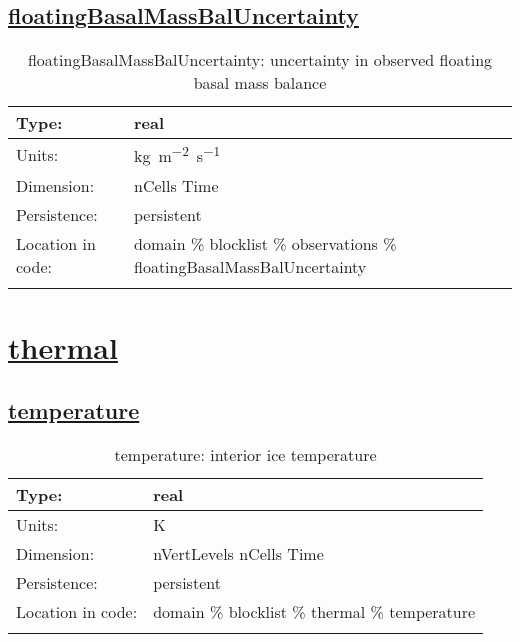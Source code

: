 \subsection[floatingBasalMassBalUncertainty]{\hyperref[sec:var_tab_observations]{floatingBasalMassBalUncertainty}}
\label{subsec:var_sec_observations_floatingBasalMassBalUncertainty}
\begin{center}
\begin{longtable}{| p{2.0in} | p{4.0in} |}
        \hline 
        Type: & real \\
        \hline 
        Units: & \si{kg.m^{-2}.s^{-1}} \\
        \hline 
        Dimension: & nCells Time \\
        \hline 
        Persistence: & persistent \\
        \hline 
         Location in code: & domain \% blocklist \% observations \% floatingBasalMassBalUncertainty \\
         \hline 
    \caption{floatingBasalMassBalUncertainty: uncertainty in observed floating basal mass balance}
\end{longtable}
\end{center}
\section[thermal]{\hyperref[sec:var_tab_thermal]{thermal}}
\label{sec:var_sec_thermal}
\subsection[temperature]{\hyperref[sec:var_tab_thermal]{temperature}}
\label{subsec:var_sec_thermal_temperature}
\begin{center}
\begin{longtable}{| p{2.0in} | p{4.0in} |}
        \hline 
        Type: & real \\
        \hline 
        Units: & \si{K} \\
        \hline 
        Dimension: & nVertLevels nCells Time \\
        \hline 
        Persistence: & persistent \\
        \hline 
         Location in code: & domain \% blocklist \% thermal \% temperature \\
         \hline 
    \caption{temperature: interior ice temperature}
\end{longtable}
\end{center}

